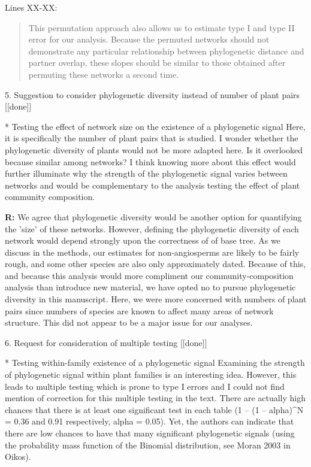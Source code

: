 \documentclass[12pt]{letter}
\newenvironment{refquote}{\bigskip \begin{it}}{\end{it}\smallskip}
\begin{document}
	Lines XX-XX:

	\begin{quotation}
		This permutation approach also allows us to estimate type I and type II 
	    error for our analysis. Because the permuted networks should not demonstrate any particular relationship between phylogenetic distance and partner overlap, these slopes should be similar to those obtained after permuting these networks a second time.
	\end{quotation}


5. Suggestion to consider phylogenetic diversity instead of number of plant pairs [[done]]

	\begin{refquote}
		* Testing the effect of network size on the existence of a phylogenetic signal
		Here, it is specifically the number of plant pairs that is studied. I wonder whether the phylogenetic diversity of plants would not be more adapted here. Is it overlooked because similar among networks?
		I think knowing more about this effect would further illuminate why the strength of the phylogenetic signal varies between networks and would be complementary to the analysis testing the effect of plant community composition.
	\end{refquote}


	\textbf{R:} We agree that phylogenetic diversity would be another option for quantifying the 'size' of these networks. However, defining the phylogenetic diversity of each network would depend strongly upon the correctness of of base tree. As we discuss in the methods, our estimates for non-angiosperms are likely to be fairly rough, and some other species are also only approximately dated. Because of this, and because this analysis would more compliment our community-composition analysis than introduce new material, we have opted no to pursue phylogenetic diversity in this manuscript. Here, we were more concerned with numbers of plant pairs since numbers of species are known to affect many areas of network structure. This did not appear to be a major issue for our analyses.


6. Request for consideration of multiple testing [[done]]

	\begin{refquote}
		* Testing within-family existence of a phylogenetic signal
		Examining the strength of phylogenetic signal within plant families is an interesting idea. However, this leads to multiple testing which is prone to type I errors and I could not find mention of correction for this multiple testing in the text. There are actually high chances that there is at least one significant test in each table (1 – (1 – alpha)^N = 0.36 and 0.91 respectively, alpha = 0.05). Yet, the authors can indicate that there are low chances to have that many significant phylogenetic signals (using the probability mass function of the Binomial distribution, see Moran 2003 in Oikos).
	\end{refquote}
\end{document}

